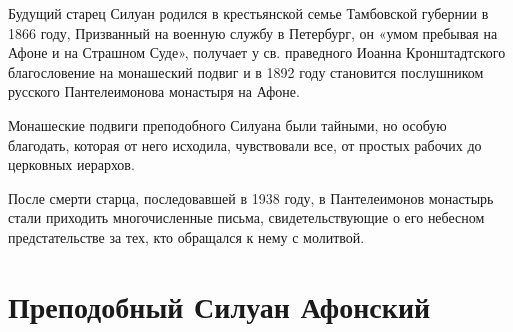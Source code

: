 \documentclass[12pt,a4paper]{article}
\begin{document}
{Будущий старец Силуан родился в крестьянской семье Тамбовской губернии в 1866 году, Призванный на военную службу в Петербург, он «умом пребывая на Афоне и на Страшном Суде», получает у св. праведного Иоанна Кронштадтского благословение на монашеский подвиг и в 1892 году становится послушником русского Пантелеимонова монастыря на Афоне.

Монашеские подвиги преподобного Силуана были тайными, но особую благодать, которая от него исходила, чувствовали все, от простых рабочих до церковных иерархов. 

}




После смерти старца, последовавшей в 1938 году, в Пантелеимонов монастырь стали приходить многочисленные письма, свидетельствующие о его небесном предстательстве за тех, кто обращался к нему с молитвой.

\section{Преподобный Силуан Афонский}


\end{document}
